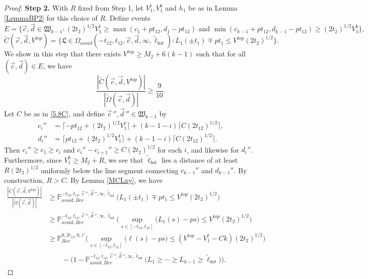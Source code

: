\begin{proof}
	{\bf \raggedleft Step 2.} With $R$ fixed from Step 1, let $V_1^t, V_1^b$ and $h_1$ be as in Lemma \ref{LemmaBP2}  for this choice of $R$. Define events
	$$E = \{ \vec{c}, \vec{d} \in \mathfrak{W}_{k-1}: (2t_2)^{1/2} V_1^t \geq \max(c_1 + p t_{12}, d_1 - pt_{12}) \mbox{ and }\min(c_{k-1} + p t_{12}, d_{k-1} - pt_{12})  \geq (2t_2)^{1/2} V_1^b \},$$
	$$ \tilde{C}(\vec{c},\vec{d},V^{top}) = \{ \mathfrak{L} \in \Omega_{avoid}(-t_{12}, t_{12}, \vec{c}, \vec{d}, \infty, \tilde{\ell}_{bot}): L_{1}(\pm t_{1}) \mp pt_1 \leq V^{top} (2t_2)^{1/2} \}.$$
	We show in this step that there exists $V^{top} \geq M_2 + 6(k-1)$ such that for all $(\vec{c}, \vec{d}) \in E$, we have
	\begin{equation}\label{5.8step2}
	\frac{|\tilde{C}(\vec{c}, \vec{d}, V^{top})|}{|\tilde{\Omega}(\vec{c},\vec{d})|} \geq  \frac{9}{10}.
	\end{equation}
	Let $C$ be as in \eqref{5.8C}, and define $\vec{c}\,'', \vec{d}\,'' \in \mathfrak{W}_{k-1}$ by
	\begin{align*}
	c_i'' &= \lceil -pt_{12} + (2t_2)^{1/2} V_1^t\rceil + (k-1-i)\lceil C(2t_{12})^{1/2}\rceil,\\
	d_i'' &= \lceil pt_{12} + (2t_2)^{1/2} V_1^t\rceil + (k-1-i)\lceil C(2t_{12})^{1/2}\rceil.
	\end{align*}
	Then $c_i'' \geq c_1 \geq c_i$ and $c_i'' - c_{i+1}'' \geq C(2t_2)^{1/2}$ for each $i$, and likewise for $d_i''$. Furthermore, since $V_1^b \geq M_2+R$, we see that $\tilde{\ell}_{bot}$ lies a distance of at least $R(2t_2)^{1/2}$ uniformly below the line segment connecting $c_{k-1}''$ and $d_{k-1}''$. By construction, $R>C$. By Lemma \ref{MCLxy}, we have
	\begin{equation}\label{5.8step3split}
	\begin{split}
	\frac{|\tilde{C}(\vec{c}, \vec{d}, V^{top})|}{|\tilde{\Omega}(\vec{c},\vec{d})|} &\geq \mathbb{P}^{-t_{12},t_{12},\vec{c}\,'', \vec{d}\,'', \infty,\tilde{\ell}_{bot}}_{avoid, Ber}\Big(L_1(\pm t_1) \mp pt_1 \leq V^{top}(2t_2)^{1/2}\Big)\\
	&\geq \mathbb{P}^{-t_{12},t_{12},\vec{c}\,'', \vec{d}\,'', \infty,\tilde{\ell}_{bot}}_{avoid, Ber}\Big(\sup_{s\in[-t_{12},t_{12}]}\big(L_1(s) - ps\big) \leq V^{top}(2t_2)^{1/2}\Big)\\
	&\geq \mathbb{P}^{0,2t_{12},0,z'}_{Ber}\Big(\sup_{s\in[-t_{12},t_{12}]}\big(\ell(s) - ps\big) \leq (V^{top}-V_1^t-Ck)(2t_2)^{1/2}\Big)\\ 
	&\qquad - \big(1 - \mathbb{P}^{-t_{12},t_{12},\vec{c}\,'', \vec{d}\,'', \infty,\tilde{\ell}_{bot}}_{avoid, Ber}\big(L_1\geq\cdots\geq L_{k-1}\geq\tilde{\ell}_{bot}\big)\big).

\end{split}
\end{equation}
\end{proof}
